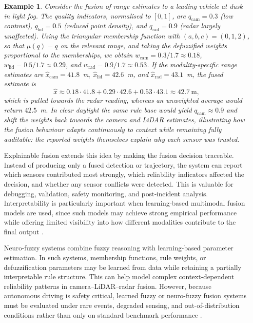 \documentclass{ieeeaccess}
\newtheorem{example}{Example}
\begin{document}
{\color{RevisionOlive}
\begin{example}
Consider the fusion of range estimates to a leading vehicle at dusk in light fog. The quality indicators, normalised to $[0,1]$, are $q_{\mathrm{cam}}=0.3$ (low contrast), $q_{\mathrm{lid}}=0.5$ (reduced point density), and $q_{\mathrm{rad}}=0.9$ (radar largely unaffected). Using the triangular membership function with $(a,b,c)=(0,1,2)$, so that $\mu(q)=q$ on the relevant range, and taking the defuzzified weights proportional to the memberships, we obtain $w_{\mathrm{cam}}=0.3/1.7\approx0.18$, $w_{\mathrm{lid}}=0.5/1.7\approx0.29$, and $w_{\mathrm{rad}}=0.9/1.7\approx0.53$. If the modality-specific range estimates are $\hat{x}_{\mathrm{cam}}=41.8$~m, $\hat{x}_{\mathrm{lid}}=42.6$~m, and $\hat{x}_{\mathrm{rad}}=43.1$~m, the fused estimate is
\begin{equation*}
\hat{x} \approx 0.18\cdot41.8 + 0.29\cdot42.6 + 0.53\cdot43.1 \approx 42.7~\mathrm{m},
\end{equation*}
which is pulled towards the radar reading, whereas an unweighted average would return $42.5$~m. In clear daylight the same rule base would yield $q_{\mathrm{cam}}\approx0.9$ and shift the weights back towards the camera and LiDAR estimates, illustrating how the fusion behaviour adapts continuously to context while remaining fully auditable: the reported weights themselves explain why each sensor was trusted.
\end{example}
}

Explainable fusion extends this idea by making the fusion decision traceable. Instead of producing only a fused detection or trajectory, the system can report which sensors contributed most strongly, which reliability indicators affected the decision, and whether any sensor conflicts were detected. This is valuable for debugging, validation, safety monitoring, and post-incident analysis. Interpretability is particularly important when learning-based multimodal fusion models are used, since such models may achieve strong empirical performance while offering limited visibility into how different modalities contribute to the final output \cite{baltrusaitis_multimodal_2019}.

Neuro-fuzzy systems combine fuzzy reasoning with learning-based parameter estimation. In such systems, membership functions, rule weights, or defuzzification parameters may be learned from data while retaining a partially interpretable rule structure. This can help model complex context-dependent reliability patterns in camera--LiDAR--radar fusion. However, because autonomous driving is safety critical, learned fuzzy or neuro-fuzzy fusion systems must be evaluated under rare events, degraded sensing, and out-of-distribution conditions rather than only on standard benchmark performance \cite{khaleghi_multisensor_2013, baltrusaitis_multimodal_2019}.
\end{document}
